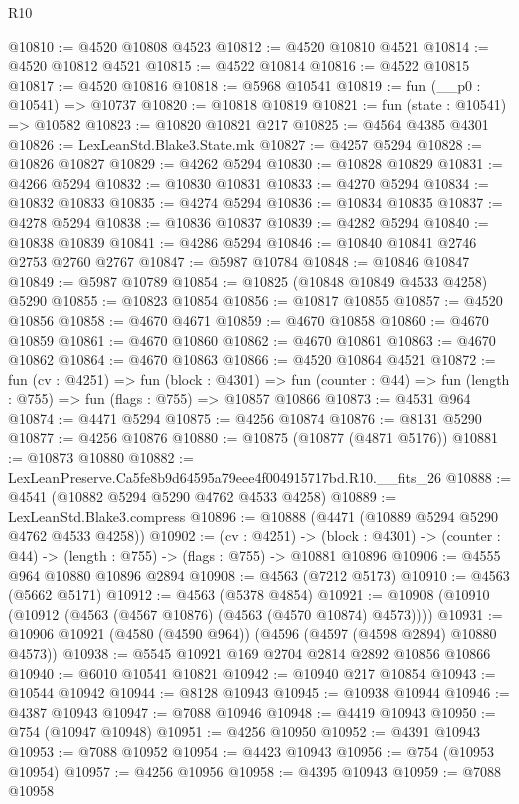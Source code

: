 \begin{lexlean}{R10}
\begin{coremodule}
@10810 := @4520 @10808 @4523
@10812 := @4520 @10810 @4521
@10814 := @4520 @10812 @4521
@10815 := @4522 @10814
@10816 := @4522 @10815
@10817 := @4520 @10816
@10818 := @5968 @10541
@10819 := fun (__p0 : @10541) => @10737
@10820 := @10818 @10819
@10821 := fun (state : @10541) => @10582
@10823 := @10820 @10821 @217
@10825 := @4564 @4385 @4301
@10826 := LexLeanStd.Blake3.State.mk
@10827 := @4257 @5294
@10828 := @10826 @10827
@10829 := @4262 @5294
@10830 := @10828 @10829
@10831 := @4266 @5294
@10832 := @10830 @10831
@10833 := @4270 @5294
@10834 := @10832 @10833
@10835 := @4274 @5294
@10836 := @10834 @10835
@10837 := @4278 @5294
@10838 := @10836 @10837
@10839 := @4282 @5294
@10840 := @10838 @10839
@10841 := @4286 @5294
@10846 := @10840 @10841 @2746 @2753 @2760 @2767
@10847 := @5987 @10784
@10848 := @10846 @10847
@10849 := @5987 @10789
@10854 := @10825 (@10848 @10849 @4533 @4258) @5290
@10855 := @10823 @10854
@10856 := @10817 @10855
@10857 := @4520 @10856
@10858 := @4670 @4671
@10859 := @4670 @10858
@10860 := @4670 @10859
@10861 := @4670 @10860
@10862 := @4670 @10861
@10863 := @4670 @10862
@10864 := @4670 @10863
@10866 := @4520 @10864 @4521
@10872 := fun (cv : @4251) =>
  fun (block : @4301) =>
  fun (counter : @44) => fun (length : @755) => fun (flags : @755) => @10857 @10866
@10873 := @4531 @964
@10874 := @4471 @5294
@10875 := @4256 @10874
@10876 := @8131 @5290
@10877 := @4256 @10876
@10880 := @10875 (@10877 (@4871 @5176))
@10881 := @10873 @10880
@10882 := LexLeanPreserve.Ca5fe8b9d64595a79eee4f004915717bd.R10.__fits_26
@10888 := @4541 (@10882 @5294 @5290 @4762 @4533 @4258)
@10889 := LexLeanStd.Blake3.compress
@10896 := @10888 (@4471 (@10889 @5294 @5290 @4762 @4533 @4258))
@10902 := (cv : @4251) ->
  (block : @4301) -> (counter : @44) -> (length : @755) -> (flags : @755) -> @10881 @10896
@10906 := @4555 @964 @10880 @10896 @2894
@10908 := @4563 (@7212 @5173)
@10910 := @4563 (@5662 @5171)
@10912 := @4563 (@5378 @4854)
@10921 := @10908 (@10910 (@10912 (@4563 (@4567 @10876) (@4563 (@4570 @10874) @4573))))
@10931 := @10906 @10921 (@4580 (@4590 @964)) (@4596 (@4597 (@4598 @2894) @10880 @4573))
@10938 := @5545 @10921 @169 @2704 @2814 @2892 @10856 @10866
@10940 := @6010 @10541 @10821
@10942 := @10940 @217 @10854
@10943 := @10544 @10942
@10944 := @8128 @10943
@10945 := @10938 @10944
@10946 := @4387 @10943
@10947 := @7088 @10946
@10948 := @4419 @10943
@10950 := @754 (@10947 @10948)
@10951 := @4256 @10950
@10952 := @4391 @10943
@10953 := @7088 @10952
@10954 := @4423 @10943
@10956 := @754 (@10953 @10954)
@10957 := @4256 @10956
@10958 := @4395 @10943
@10959 := @7088 @10958

\end{coremodule}
\end{lexlean}
